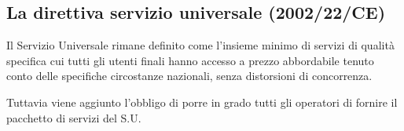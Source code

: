 \subsection{La direttiva servizio universale (2002/22/CE)}

Il Servizio Universale rimane definito come l'insieme minimo di servizi di qualità specifica cui tutti gli utenti finali hanno accesso a prezzo abbordabile tenuto conto delle specifiche circostanze nazionali, senza distorsioni di concorrenza.

Tuttavia viene aggiunto l’obbligo di porre in grado tutti gli operatori di fornire il pacchetto di servizi del S.U.